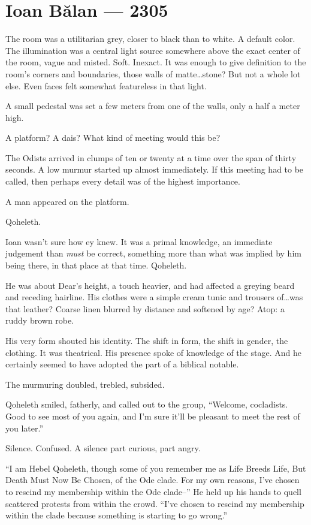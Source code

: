 \hypertarget{ioan-bux103lan-2305}{%
\chapter*{Ioan Bălan — 2305}\label{ioan-bux103lan-2305}}

The room was a utilitarian grey, closer to black than to white. A default color. The illumination was a central light source somewhere above the exact center of the room, vague and misted. Soft. Inexact. It was enough to give definition to the room's corners and boundaries, those walls of matte\ldots{}stone? But not a whole lot else. Even faces felt somewhat featureless in that light.

A small pedestal was set a few meters from one of the walls, only a half a meter high.

A platform? A dais? What kind of meeting would this be?

The Odists arrived in clumps of ten or twenty at a time over the span of thirty seconds. A low murmur started up almost immediately. If this meeting had to be called, then perhaps every detail was of the highest importance.

A man appeared on the platform.

Qoheleth.

Ioan wasn't sure how ey knew. It was a primal knowledge, an immediate judgement than \emph{must} be correct, something more than what was implied by him being there, in that place at that time. Qoheleth.

He was about Dear's height, a touch heavier, and had affected a greying beard and receding hairline. His clothes were a simple cream tunic and trousers of\ldots{}was that leather? Coarse linen blurred by distance and softened by age? Atop: a ruddy brown robe.

His very form shouted his identity. The shift in form, the shift in gender, the clothing. It was theatrical. His presence spoke of knowledge of the stage. And he certainly seemed to have adopted the part of a biblical notable.

The murmuring doubled, trebled, subsided.

Qoheleth smiled, fatherly, and called out to the group, ``Welcome, cocladists. Good to see most of you again, and I'm sure it'll be pleasant to meet the rest of you later.''

Silence. Confused. A silence part curious, part angry.

``I am Hebel Qoheleth, though some of you remember me as Life Breeds Life, But Death Must Now Be Chosen, of the Ode clade. For my own reasons, I've chosen to rescind my membership within the Ode clade--'' He held up his hands to quell scattered protests from within the crowd. ``I've chosen to rescind my membership within the clade because something is starting to go wrong.''


